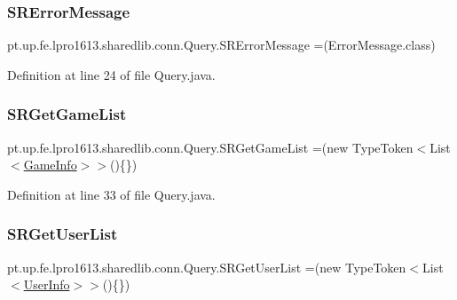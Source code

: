 \subsubsection{\texorpdfstring{S\+R\+Error\+Message}{SRErrorMessage}}
{\footnotesize\ttfamily pt.\+up.\+fe.\+lpro1613.\+sharedlib.\+conn.\+Query.\+S\+R\+Error\+Message =(Error\+Message.\+class)}



Definition at line 24 of file Query.\+java.

\hypertarget{enumpt_1_1up_1_1fe_1_1lpro1613_1_1sharedlib_1_1conn_1_1_query_aecfe06afd2edfe3f3175db6b0164bdab}{}\label{enumpt_1_1up_1_1fe_1_1lpro1613_1_1sharedlib_1_1conn_1_1_query_aecfe06afd2edfe3f3175db6b0164bdab} 
\subsubsection{\texorpdfstring{S\+R\+Get\+Game\+List}{SRGetGameList}}
{\footnotesize\ttfamily pt.\+up.\+fe.\+lpro1613.\+sharedlib.\+conn.\+Query.\+S\+R\+Get\+Game\+List =(new Type\+Token$<$List$<$\hyperlink{classpt_1_1up_1_1fe_1_1lpro1613_1_1sharedlib_1_1tuples_1_1_game_info}{Game\+Info}$>$$>$()\{\})}



Definition at line 33 of file Query.\+java.

\hypertarget{enumpt_1_1up_1_1fe_1_1lpro1613_1_1sharedlib_1_1conn_1_1_query_ad743a85e754f5d1d070fe30d8cf1ae25}{}\label{enumpt_1_1up_1_1fe_1_1lpro1613_1_1sharedlib_1_1conn_1_1_query_ad743a85e754f5d1d070fe30d8cf1ae25} 
\subsubsection{\texorpdfstring{S\+R\+Get\+User\+List}{SRGetUserList}}
{\footnotesize\ttfamily pt.\+up.\+fe.\+lpro1613.\+sharedlib.\+conn.\+Query.\+S\+R\+Get\+User\+List =(new Type\+Token$<$List$<$\hyperlink{classpt_1_1up_1_1fe_1_1lpro1613_1_1sharedlib_1_1tuples_1_1_user_info}{User\+Info}$>$$>$()\{\})}



